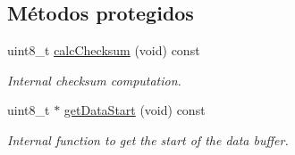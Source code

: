 \subsection*{\-Métodos protegidos}
\begin{DoxyCompactItemize}
\item 
\hypertarget{classxsens_1_1Message_abf49d6900168d28a9a3a262e18c4a922}{uint8\-\_\-t \hyperlink{classxsens_1_1Message_abf49d6900168d28a9a3a262e18c4a922}{calc\-Checksum} (void) const }\label{classxsens_1_1Message_abf49d6900168d28a9a3a262e18c4a922}

\begin{DoxyCompactList}\small\item\em \-Internal checksum computation. \end{DoxyCompactList}\item 
\hypertarget{classxsens_1_1Message_ab88e88d57185f046a5cd2522e185fea3}{uint8\-\_\-t $\ast$ \hyperlink{classxsens_1_1Message_ab88e88d57185f046a5cd2522e185fea3}{get\-Data\-Start} (void) const }\label{classxsens_1_1Message_ab88e88d57185f046a5cd2522e185fea3}

\begin{DoxyCompactList}\small\item\em \-Internal function to get the start of the data buffer. \end{DoxyCompactList}\end{DoxyCompactItemize}
